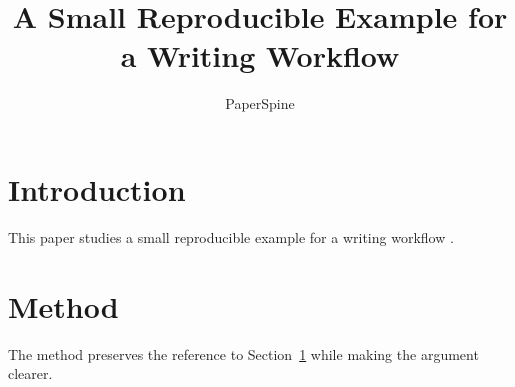 \documentclass{article}
\title{A Small Reproducible Example for a Writing Workflow}
\author{PaperSpine}
\begin{document}
\maketitle

\section{Introduction}
\label{sec:intro}
This paper studies a small reproducible example for a writing workflow \cite{smith2024example}.

\section{Method}
The method preserves the reference to Section~\ref{sec:intro} while making the argument clearer.
\end{document}
